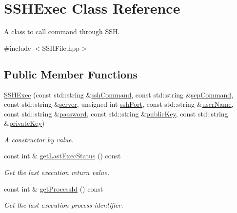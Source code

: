 \hypertarget{classSSHExec}{
\section{SSHExec Class Reference}
\label{classSSHExec}
}


A class to call command through SSH.  




{\ttfamily \#include $<$SSHFile.hpp$>$}

\subsection*{Public Member Functions}
\begin{DoxyCompactItemize}
\item 
\hyperlink{classSSHExec_a6864edb815f1d885d7a2658ca2c2d203}{SSHExec} (const std::string \&\hyperlink{classSSHExec_a4bceea8b974f6d0315f09522bebe119a}{sshCommand}, const std::string \&\hyperlink{classSSHExec_adcc31b1f8d6749e54128b15ae75b8fcd}{scpCommand}, const std::string \&\hyperlink{classSSHExec_a33551d1b24c5b4dc3194d54270ce32b3}{server}, unsigned int \hyperlink{classSSHExec_aa36c6d12d08f87f32af8bfce7b7f50ac}{sshPort}, const std::string \&\hyperlink{classSSHExec_a8f409ce4f379cd5fed42eeb92f5d8bb9}{userName}, const std::string \&\hyperlink{classSSHExec_af30f176105ad0e2c1b8fb3d398b4494a}{password}, const std::string \&\hyperlink{classSSHExec_acfbcc8d21597233b15b03e1616108a53}{publicKey}, const std::string \&\hyperlink{classSSHExec_acccc21fc8f8bbc8abb6697dd542be0fe}{privateKey})
\begin{DoxyCompactList}\small\item\em A constructor by value. \item\end{DoxyCompactList}\item 
const int \& \hyperlink{classSSHExec_ad18b5a9cedfcfa8bdb81d5946c4be0b0}{getLastExecStatus} () const 
\begin{DoxyCompactList}\small\item\em Get the last execution return value. \item\end{DoxyCompactList}\item 
const int \& \hyperlink{classSSHExec_aa6cefad5f745b6773766aed355e45ab7}{getProcessId} () const 
\begin{DoxyCompactList}\small\item\em Get the last execution process identifier. \item\end{DoxyCompactList}\item 

\end{DoxyCompactItemize}
